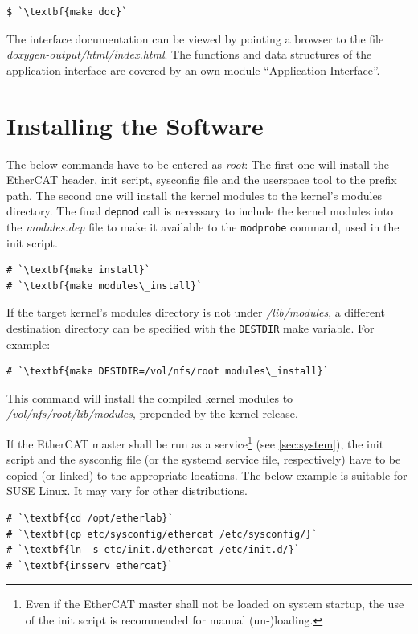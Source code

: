 \documentclass[a4paper,12pt,BCOR=6mm,bibtotoc,idxtotoc]{scrbook}
\begin{document}
\begin{lstlisting}
$ `\textbf{make doc}`
\end{lstlisting}

The interface documentation can be viewed by pointing a browser to the file
\textit{doxygen-output/html/index.html}. The functions and data structures of
the application interface are covered by an own module ``Application
Interface''.

\section{Installing the Software}

The below commands have to be entered as \textit{root}: The first one will
install the EtherCAT header, init script, sysconfig file and the userspace
tool to the prefix path. The second one will install the kernel modules to the
kernel's modules directory. The final \lstinline+depmod+ call is necessary to
include the kernel modules into the \textit{modules.dep} file to make it
available to the \lstinline+modprobe+ command, used in the init script.

\begin{lstlisting}
# `\textbf{make install}`
# `\textbf{make modules\_install}`
\end{lstlisting}

If the target kernel's modules directory is not under \textit{/lib/modules}, a
different destination directory can be specified with the \lstinline+DESTDIR+
make variable. For example:

\begin{lstlisting}
# `\textbf{make DESTDIR=/vol/nfs/root modules\_install}`
\end{lstlisting}

This command will install the compiled kernel modules to
\textit{/vol/nfs/root/lib/modules}, prepended by the kernel release.

If the EtherCAT master shall be run as a service\footnote{Even if the EtherCAT
master shall not be loaded on system startup, the use of the init script is
recommended for manual (un-)loading.} (see \autoref{sec:system}), the init
script and the sysconfig file (or the systemd service file, respectively) have
to be copied (or linked) to the appropriate locations. The below example is
suitable for SUSE Linux. It may vary for other distributions.

\begin{lstlisting}
# `\textbf{cd /opt/etherlab}`
# `\textbf{cp etc/sysconfig/ethercat /etc/sysconfig/}`
# `\textbf{ln -s etc/init.d/ethercat /etc/init.d/}`
# `\textbf{insserv ethercat}`
\end{lstlisting}
\end{document}
